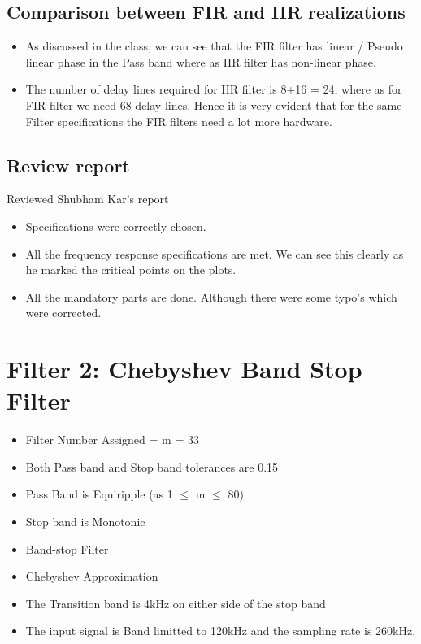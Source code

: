 \documentclass[12pt]{article}
\begin{document}
	\color{cyan}
	\subsection{Comparison between FIR and IIR realizations}
	\color{black}
	\begin{itemize}
		\item As discussed in the class, we can see that the FIR filter has linear / Pseudo linear phase in the Pass band where as IIR filter has non-linear phase.
		\item The number of delay lines required for IIR filter is 8+16 = 24, where as for FIR filter we need 68 delay lines.  Hence it is very evident that for the same Filter specifications the FIR filters need a lot more hardware. 
	\end{itemize}
	
	\color{cyan}
	\subsection{Review report}
	\color{black}
	Reviewed Shubham Kar's report
	\begin{itemize}
		\item Specifications were correctly chosen.
		\item All the frequency response specifications are met. We can see this clearly as he marked the critical points on the plots.
		\item All the mandatory parts are done. Although there were some typo's which were corrected.
		
	\end{itemize}
	
	  
	
	
	\newpage
	\color{darkblue}
	\section{Filter 2: Chebyshev Band Stop Filter}
	\color{black}
	\begin{itemize}
		\item Filter Number Assigned = m = 33
		\item Both Pass band and Stop band tolerances are 0.15
		\item Pass Band is Equiripple (as 1 $\le$ m $\le$ 80)
		\item Stop band is Monotonic 
		\item Band-stop Filter
		\item Chebyshev Approximation
		\item The Transition band is 4kHz on either side of the stop band
		\item The input signal is Band limitted to 120kHz and the sampling rate is 260kHz.
	\end{itemize}
	\color{cyan}
\end{document}
